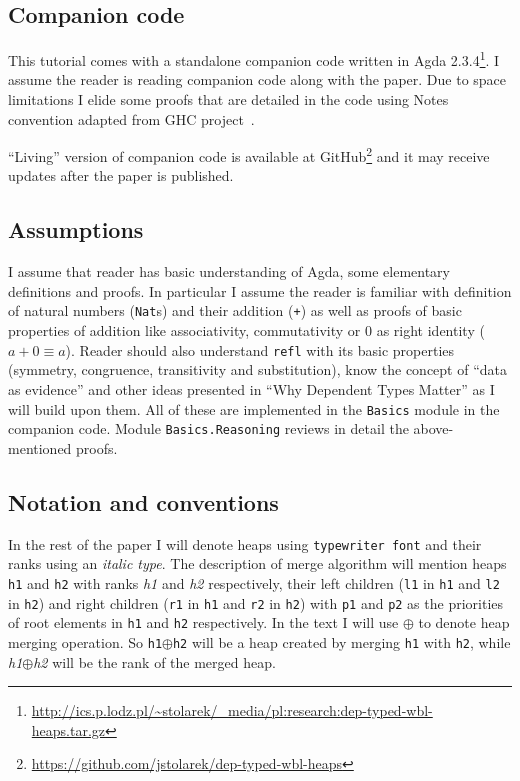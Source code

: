 \subsection{Companion code}

This tutorial comes with a standalone companion code written in Agda 2.3.4\footnote{\url{http://ics.p.lodz.pl/~stolarek/_media/pl:research:dep-typed-wbl-heaps.tar.gz}}. I assume the reader is reading companion code along with the paper. Due to space limitations I elide some proofs that are detailed in the code using Notes convention adapted from GHC project~\cite{MarPey12}.

``Living'' version of companion code is available at GitHub\footnote{\url{https://github.com/jstolarek/dep-typed-wbl-heaps}} and it may receive updates after the paper is published.

\subsection{Assumptions}

I assume that reader has basic understanding of Agda, some elementary definitions and proofs. In particular I assume the reader is familiar with definition of natural numbers (\texttt{Nat}s) and their addition (\texttt{+}) as well as proofs of basic properties of addition like associativity, commutativity or 0 as right identity ($a + 0 ≡ a$). Reader should also understand \texttt{refl} with its basic properties (symmetry, congruence, transitivity and substitution), know the concept of ``data as evidence'' and other ideas presented in ``Why Dependent Types Matter'' \cite{AltMcBMcK05} as I will build upon them. All of these are implemented in the \texttt{Basics} module in the companion code. Module \texttt{Basics.Reasoning} reviews in detail the above-mentioned proofs.

\subsection{Notation and conventions}

In the rest of the paper I will denote heaps using \texttt{typewriter font} and their ranks using an \textit{italic type}. The description of merge algorithm will mention heaps \texttt{h1} and \texttt{h2} with ranks \textit{h1} and \textit{h2} respectively, their left children (\texttt{l1} in \texttt{h1} and \texttt{l2} in \texttt{h2}) and right children (\texttt{r1} in \texttt{h1} and \texttt{r2} in \texttt{h2}) with \texttt{p1} and \texttt{p2} as the priorities of root elements in \texttt{h1} and \texttt{h2} respectively. In the text I will use $\oplus$ to denote heap merging operation. So \texttt{h1}$\oplus$\texttt{h2} will be a heap created by merging \texttt{h1} with \texttt{h2}, while \textit{h1}$\oplus$\textit{h2} will be the rank of the merged heap.

